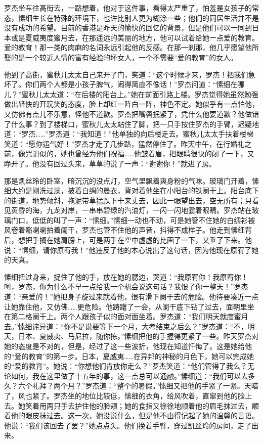 \par 罗杰坐车往高街去，一路想着，他对于这件事，看得太严重了，怕羞是女孩子的常态，愫细生长在特殊的环境下，也许比别人更为糊涂一些；他们的同居生活并不是没有成功的希望。目前的香港是昨天的愉快的回忆的背景，但是他们可以一同到日本或是夏威夷度蜜月去，在那遥远的美丽的地方，他可以试着给她一点爱的教育。爱的教育！那一类的肉麻的名词永远引起他的反感。在那一刹那，他几乎愿望他所娶的是一个较近人情的富有经验的坏女人，一个不需要“爱的教育”的女人。
\par 他到了高街，蜜秋儿太太自己来开了门，笑道：“这个时候才来，罗杰！把我们急坏了。你们两个人都是小孩子脾气，闹得简直不像话！”罗杰问道：“愫细在哪儿？”蜜秋儿太太道：“在后楼的阳台上。”她在前面引路上楼。罗杰觉得她虽然勉强做出轻快的开玩笑的态度，脸上却红一阵白一阵，神色不定。她似乎有一点怕他，又仿佛有点儿不乐意，怪他不道歉。罗杰把嘴唇抿紧了，凭什么他要道歉？他做错了什么事？到了楼梯口，蜜秋儿太太站住了脚，把一只手按住罗杰的手臂，迟疑地道：“罗杰……”罗杰道：“我知道！”他单独的向后楼走去。蜜秋儿太太手扶着楼梯笑道：“愿你运气好！”罗杰才走了几步路，猛然停住了。昨天中午，在行婚礼之前，像咒诅似的，她也曾经为他们祝福……他皱着眉，把眼睛很快的闭了一下，又睁开了。他没有回过头来，草草的说了一声：“谢谢你！”就进了房。
\par 那是凯丝玲的卧室，暗沉沉的没点灯，空气里飘着爽身粉的气味。玻璃门开着，愫细大约是刚洗过澡，披着白绸的晨衣，背对着他坐在小阳台的铁阑干上。阳台底下的街道，地势倾斜，拖泥带草猛跌下十来丈去，因此一眼望出去，空无所有；只看见黄昏的海，九龙对岸，一串串碧绿的汽油灯，一闪一闪地霎着眼睛。罗杰站在玻璃门口，低低的叫了一声：“愫细。”愫细一动也不动，可是她管不住她的白绸衫被风卷着豁喇喇拍着阑干，罗杰也管不住他的声音，抖得不成样子。他走到愫细背后，想把手搁在她肩膀上，可是两手在空中虚虚的比画了一下，又垂了下来。他说：“愫细，请你原宥我！”他违反了他的本心说出了这句话，因为他现在原宥了她的天真。
\par 愫细扭过身来，捉住了他的手，放在她的腮边，哭道：“我原宥你！我原宥你！呵，罗杰，你为什么不早一点给我一个机会说这句话？我恨了你一整天！”罗杰道：“亲爱的！”她把身子旋过来就着他，很有滑下阑干去的危险。他待要凑近一点让她靠住他，又仿佛……更危险。他踌躇了一会，从阑干底下钻了过去，面朝里坐在第二格阑干上。两个人跟孩子似的面对面坐着。罗杰道：“我们明天就度蜜月去。”愫细诧异道：“你不是说要等下一个月，大考结束之后么？”罗杰道：“不，明天，日本、夏威夷、马尼拉，随你拣。”愫细把他的手握得更紧了一些。昨天罗杰对她的态度是不对的，但是，经过了这一些波折，他现在知道忏悔了。这是她给他的“爱的教育”的第一步。日本，夏威夷……在异邦的神秘的月色下，她可以完成她的“爱的教育”。她说：“你想他们肯放你走么？”罗杰笑道：“他们管得了我么？无论如何，我在这里做了十五年的事，这一点总可以通融。”愫细道：“我们可以去多久？六个礼拜？两个月？”罗杰道：“整个的暑假。”愫细又把他的手紧了一紧。天暗了，风也紧了。罗杰坐的地位比较低，愫细的衣角，给风吹着，直窜到他的脸上去。她笑着用两只手去护住他的脸颊；她的食指又徐徐地顺着他的眉毛抹过去，顺着他的眼皮抹过去。这一次，她没说什么，但是他不由得记起了她的温馨的言语。他说：“我们该回去了罢？”她点点头。他们挽着手臂，穿过凯丝玲的房间，走了出来。
